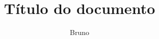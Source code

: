 \documentclass{article}
\title{Título do documento}
\author{Bruno}
\begin{document}
\maketitle
\begin{abstract}
	
\end{abstract}
\glsresetall

\printbibliography
\end{document}
